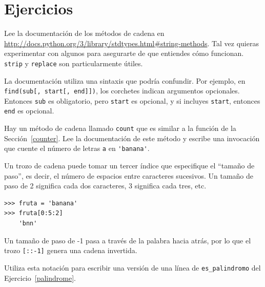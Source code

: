 \documentclass[10pt]{book}
\begin{document}
\section{Ejercicios}

\begin{exercise}

Lee la documentación de los métodos de cadena en
\url{http://docs.python.org/3/library/stdtypes.html#string-methods}.
Tal vez quieras experimentar con algunos para asegurarte de que
entiendes cómo funcionan.  {\tt strip} y {\tt replace} son
particularmente útiles.

La documentación utiliza una sintaxis que podría confundir.
Por ejemplo, en \verb"find(sub[, start[, end]])", los corchetes
indican argumentos opcionales.  Entonces {\tt sub} es obligatorio, pero
{\tt start} es opcional, y si incluyes {\tt start},
entonces {\tt end} es opcional.

\end{exercise}


\begin{exercise}

Hay un método de cadena llamado {\tt count} que es similar
a la función de la Sección~\ref{counter}.  Lee la documentación
de este método
y escribe una invocación que cuente el número de letras {\tt a}
en \verb"'banana'".
\end{exercise}


\begin{exercise}

Un trozo de cadena puede tomar un tercer índice que especifique el ``tamaño
de paso'', es decir, el número de espacios entre caracteres sucesivos.
Un tamaño de paso de 2 significa cada dos caracteres, 3 significa cada tres,
etc.

\begin{verbatim}
>>> fruta = 'banana'
>>> fruta[0:5:2]
    'bnn'
\end{verbatim}

Un tamaño de paso de -1 pasa a través de la palabra hacia atrás, por lo que
el trozo \verb"[::-1]" genera una cadena invertida.

Utiliza esta notación para escribir una versión de una línea de \verb"es_palindromo"
del Ejercicio~\ref{palindrome}.
\end{exercise}
\end{document}
